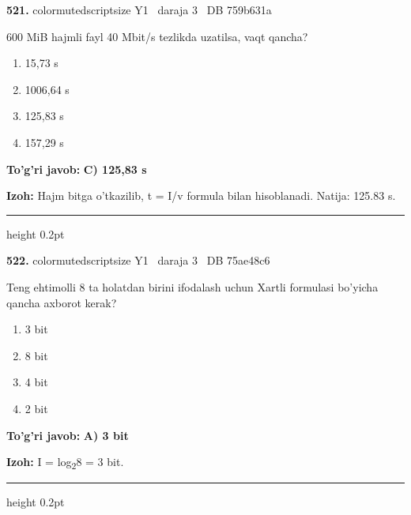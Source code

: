 \documentclass[10pt,a4paper,oneside]{article}
\begin{document}
\noindent\textbf{\color{ink}521.}  {color{muted}scriptsize Y1 \textbullet\ daraja 3 \textbullet\ DB 759b631a}
\par
600 MiB hajmli fayl 40 Mbit/s tezlikda uzatilsa, vaqt qancha?
\begin{enumerate}[label=\Alph*),leftmargin=9mm]
\item 15,73 s
\item 1006,64 s
\item 125,83 s
\item 157,29 s
\end{enumerate}
\begin{tcolorbox}[enhanced,breakable,colback=teal!4,colframe=teal!50!black,boxrule=0.5pt,arc=1.1mm,left=3mm,right=3mm,top=1.7mm,bottom=1.7mm,before skip=2mm,after skip=2mm]
\textbf{\color{teal}To'g'ri javob:} \textbf{C) 125,83 s}
\par\smallskip
\textbf{Izoh:} Hajm bitga o'tkazilib, t = I/v formula bilan hisoblanadi. Natija: 125.83 s.
\end{tcolorbox}
\vspace{2mm}\hrule height 0.2pt \vspace{3mm}

\noindent\textbf{\color{ink}522.}  {color{muted}scriptsize Y1 \textbullet\ daraja 3 \textbullet\ DB 75ae48c6}
\par
Teng ehtimolli 8 ta holatdan birini ifodalash uchun Xartli formulasi bo'yicha qancha axborot kerak?
\begin{enumerate}[label=\Alph*),leftmargin=9mm]
\item 3 bit
\item 8 bit
\item 4 bit
\item 2 bit
\end{enumerate}
\begin{tcolorbox}[enhanced,breakable,colback=teal!4,colframe=teal!50!black,boxrule=0.5pt,arc=1.1mm,left=3mm,right=3mm,top=1.7mm,bottom=1.7mm,before skip=2mm,after skip=2mm]
\textbf{\color{teal}To'g'ri javob:} \textbf{A) 3 bit}
\par\smallskip
\textbf{Izoh:} I = log\textsubscript{2}8 = 3 bit.
\end{tcolorbox}
\vspace{2mm}\hrule height 0.2pt \vspace{3mm}
\end{document}
